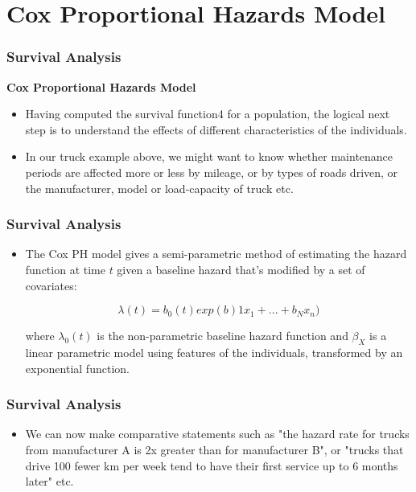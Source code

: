 	\section{Cox Proportional Hazards Model}
	\begin{frame}
		\frametitle{Survival Analysis}
		\noindent \textbf{Cox Proportional Hazards Model}
		
		\begin{itemize}
			\item Having computed the survival function4 for a population, the logical next step is to understand the effects of different characteristics of the individuals. 
			\item In our truck example above, we might want to know whether maintenance periods are affected more or less by mileage, or by types of roads driven, or the manufacturer, model or load-capacity of truck etc.
		\end{itemize}
		
	\end{frame}
	\begin{frame}
		\frametitle{Survival Analysis}
		\begin{itemize}
			\item The Cox PH model gives a semi-parametric method of estimating the hazard function at time $t$ given a baseline hazard that's modified by a set of covariates:
			
			\[\lambda(t)=b_0(t)exp(b)1x_1+...+b_Nx_n)\]
			
			where $\lambda_0(t)$ is the non-parametric baseline hazard function and $\beta_X$ is a linear parametric model using features of the individuals, transformed by an exponential function.
		\end{itemize}
		
	\end{frame}
	\begin{frame}
		\frametitle{Survival Analysis}
		\begin{itemize}
			\item We can now make comparative statements such as "the hazard rate for trucks from manufacturer A is 2x greater than for manufacturer B", or "trucks that drive 100 fewer km per week tend to have their first service up to 6 months later" etc.
		\end{itemize}
		
		
	\end{frame}
